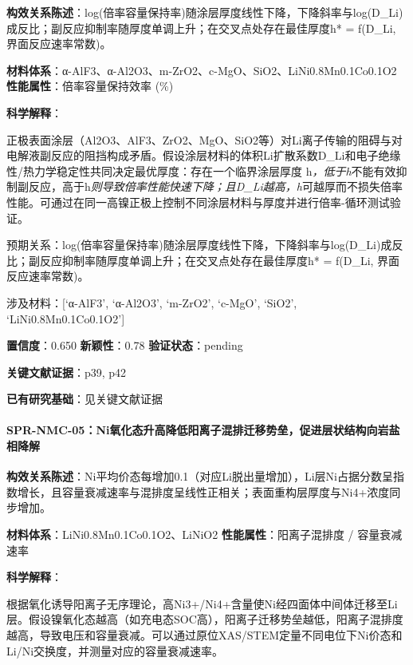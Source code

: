 \documentclass[12pt,a4paper]{ctexart}
\begin{document}
\textbf{构效关系陈述}：log(倍率容量保持率)随涂层厚度线性下降，下降斜率与log(D\_Li)成反比；副反应抑制率随厚度单调上升；在交叉点处存在最佳厚度h* = f(D\_Li, 界面反应速率常数)。

\textbf{材料体系}：α-AlF3、α-Al2O3、m-ZrO2、c-MgO、SiO2、LiNi0.8Mn0.1Co0.1O2 \textbar{} \textbf{性能属性}：倍率容量保持效率 (\%)

\textbf{科学解释}：

正极表面涂层（Al2O3、AlF3、ZrO2、MgO、SiO2等）对Li离子传输的阻碍与对电解液副反应的阻挡构成矛盾。假设涂层材料的体积Li扩散系数D\_Li和电子绝缘性/热力学稳定性共同决定最优厚度：存在一个临界涂层厚度 h\emph{，低于h}不能有效抑制副反应，高于h\emph{则导致倍率性能快速下降；且D\_Li越高，h}可越厚而不损失倍率性能。可通过在同一高镍正极上控制不同涂层材料与厚度并进行倍率-循环测试验证。

预期关系：log(倍率容量保持率)随涂层厚度线性下降，下降斜率与log(D\_Li)成反比；副反应抑制率随厚度单调上升；在交叉点处存在最佳厚度h* = f(D\_Li, 界面反应速率常数)。

涉及材料：{[}`α-AlF3', `α-Al2O3', `m-ZrO2', `c-MgO', `SiO2', `LiNi0.8Mn0.1Co0.1O2'{]}

\textbf{置信度}：0.650 \textbar{} \textbf{新颖性}：0.78 \textbar{} \textbf{验证状态}：pending

\textbf{关键文献证据}：p39, p42

\textbf{已有研究基础}：见关键文献证据

\paragraph{SPR-NMC-05：Ni氧化态升高降低阳离子混排迁移势垒，促进层状结构向岩盐相降解}\label{spr-nmc-05niux6c27ux5316ux6001ux5347ux9ad8ux964dux4f4eux9633ux79bbux5b50ux6df7ux6392ux8fc1ux79fbux52bfux5792ux4fc3ux8fdbux5c42ux72b6ux7ed3ux6784ux5411ux5ca9ux76d0ux76f8ux964dux89e3}

\textbf{构效关系陈述}：Ni平均价态每增加0.1（对应Li脱出量增加），Li层Ni占据分数呈指数增长，且容量衰减速率与混排度呈线性正相关；表面重构层厚度与Ni4+浓度同步增加。

\textbf{材料体系}：LiNi0.8Mn0.1Co0.1O2、LiNiO2 \textbar{} \textbf{性能属性}：阳离子混排度 / 容量衰减速率

\textbf{科学解释}：

根据氧化诱导阳离子无序理论，高Ni3+/Ni4+含量使Ni经四面体中间体迁移至Li层。假设镍氧化态越高（如充电态SOC高），阳离子迁移势垒越低，阳离子混排度越高，导致电压和容量衰减。可以通过原位XAS/STEM定量不同电位下Ni价态和Li/Ni交换度，并测量对应的容量衰减速率。
\end{document}
